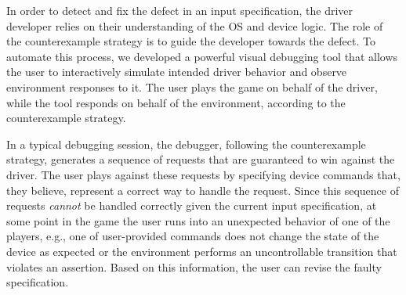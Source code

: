 \documentclass[a4paper,twoside,openright,11pt]{book}
\theoremstyle{definition}
\begin{document}

In order to detect and fix the defect in an input specification, the driver developer relies on their  understanding of the OS and device logic.  The role of the counterexample strategy is to guide the developer towards the defect.  To automate this process, we developed a powerful visual debugging tool that allows the user to interactively simulate intended driver behavior and observe environment responses to it.  The user plays the game on behalf of the driver, while the tool responds on behalf of the environment, according to the counterexample strategy.
 
In a typical debugging session, the debugger, following the counterexample strategy, generates a sequence of requests that are guaranteed to win against the driver.  The user plays against these requests by specifying device commands that, they believe, represent a correct way to handle the request.  Since this sequence of requests \emph{cannot} be handled correctly given the current input specification, at some point in the game the user runs into an unexpected behavior of one of the players, e.g., one of user-provided commands does not change the state of the device as expected or the environment performs an uncontrollable transition that violates an assertion.  Based on this information, the user can revise the faulty specification.

%       
%        
\end{document}
